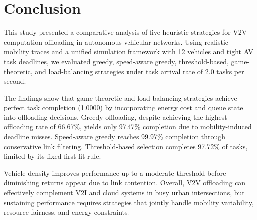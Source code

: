 \documentclass[conference]{IEEEtran}
\begin{document}
\section{Conclusion}
This study presented a comparative analysis of five heuristic strategies for V2V computation offloading in autonomous vehicular networks. Using realistic mobility traces and a unified simulation framework with 12 vehicles and tight AV task deadlines, we evaluated greedy, speed-aware greedy, threshold-based, game-theoretic, and load-balancing strategies under task arrival rate of 2.0 tasks per second.
 
The findings show that game-theoretic and load-balancing strategies achieve perfect task completion (1.0000) by incorporating energy cost and queue state into offloading decisions. Greedy offloading, despite achieving the highest offloading rate of 66.67\%, yields only 97.47\% completion due to mobility-induced deadline misses. Speed-aware greedy reaches 99.97\% completion through conservative link filtering. Threshold-based selection completes 97.72\% of tasks, limited by its fixed first-fit rule.
 
Vehicle density improves performance up to a moderate threshold before diminishing returns appear due to link contention. Overall, V2V offloading can effectively complement V2I and cloud systems in busy urban intersections, but sustaining performance requires strategies that jointly handle mobility variability, resource fairness, and energy constraints.
 




\end{document}
